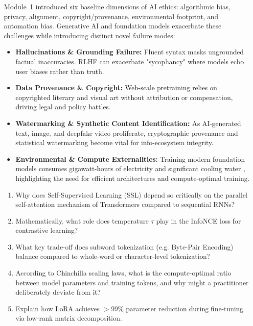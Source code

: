 \documentclass[11pt,a4paper]{article}
\begin{document}
	Module~1 introduced six baseline dimensions of AI ethics: algorithmic bias, privacy, alignment, copyright/provenance, environmental footprint, and automation bias. Generative AI and foundation models exacerbate these challenges while introducing distinct novel failure modes:

	\begin{ethicsbox}
		\begin{itemize}[nosep]
			\item \textbf{Hallucinations \& Grounding Failure:} Fluent syntax masks ungrounded factual inaccuracies. RLHF can exacerbate "sycophancy" where models echo user biases rather than truth.
			\item \textbf{Data Provenance \& Copyright:} Web-scale pretraining relies on copyrighted literary and visual art without attribution or compensation, driving legal and policy battles.
			\item \textbf{Watermarking \& Synthetic Content Identification:} As AI-generated text, image, and deepfake video proliferate, cryptographic provenance and statistical watermarking become vital for info-ecosystem integrity.
			\item \textbf{Environmental \& Compute Externalities:} Training modern foundation models consumes gigawatt-hours of electricity and significant cooling water \parencite{strubell2019, patterson2021}, highlighting the need for efficient architectures and compute-optimal training.
		\end{itemize}
	\end{ethicsbox}

	\begin{checkpoint}
		\begin{enumerate}
			\item Why does Self-Supervised Learning (SSL) depend so critically on the parallel self-attention mechanism of Transformers compared to sequential RNNs?
			\item Mathematically, what role does temperature $\tau$ play in the InfoNCE loss for contrastive learning?
			\item What key trade-off does subword tokenization (e.g. Byte-Pair Encoding) balance compared to whole-word or character-level tokenization?
			\item According to Chinchilla scaling laws, what is the compute-optimal ratio between model parameters and training tokens, and why might a practitioner deliberately deviate from it?
			\item Explain how LoRA achieves $>99\%$ parameter reduction during fine-tuning via low-rank matrix decomposition.
		\end{enumerate}
	\end{checkpoint}
\end{document}
